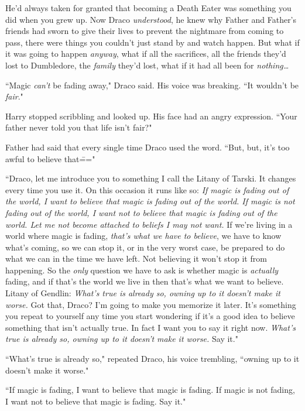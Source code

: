 He'd always taken for granted that becoming a Death Eater was something you did when you grew up. Now Draco \emph{understood}, he knew why Father and Father's friends had sworn to give their lives to prevent the nightmare from coming to pass, there were things you couldn't just stand by and watch happen. But what if it was going to happen \emph{anyway}, what if all the sacrifices, all the friends they'd lost to Dumbledore, the \emph{family} they'd lost, what if it had all been for \emph{nothing{\ldots}}

``Magic \emph{can't} be fading away," Draco said. His voice was breaking. ``It wouldn't be \emph{fair}."

Harry stopped scribbling and looked up. His face had an angry expression. ``Your father never told you that life isn't fair?"

Father had said that every single time Draco used the word. ``But, but, it's too awful to believe that\==="

``Draco, let me introduce you to something I call the Litany of Tarski. It changes every time you use it. On this occasion it runs like so: \emph{If magic is fading out of the world, I want to believe that magic is fading out of the world. If magic is not fading out of the world, I want not to believe that magic is fading out of the world. Let me not become attached to beliefs I may not want.} If we're living in a world where magic is fading, \emph{that's what we have to believe}, we have to know what's coming, so we can stop it, or in the very worst case, be prepared to do what we can in the time we have left. Not believing it won't stop it from happening. So the \emph{only} question we have to ask is whether magic is \emph{actually} fading, and if that's the world we live in then that's what we want to believe. Litany of Gendlin: \emph{What's true is already so, owning up to it doesn't make it worse.} Got that, Draco? I'm going to make you memorize it later. It's something you repeat to yourself any time you start wondering if it's a good idea to believe something that isn't actually true. In fact I want you to say it right now. \emph{What's true is already so, owning up to it doesn't make it worse.} Say it."

``What's true is already so," repeated Draco, his voice trembling, ``owning up to it doesn't make it worse."

``If magic is fading, I want to believe that magic is fading. If magic is not fading, I want not to believe that magic is fading. Say it."

